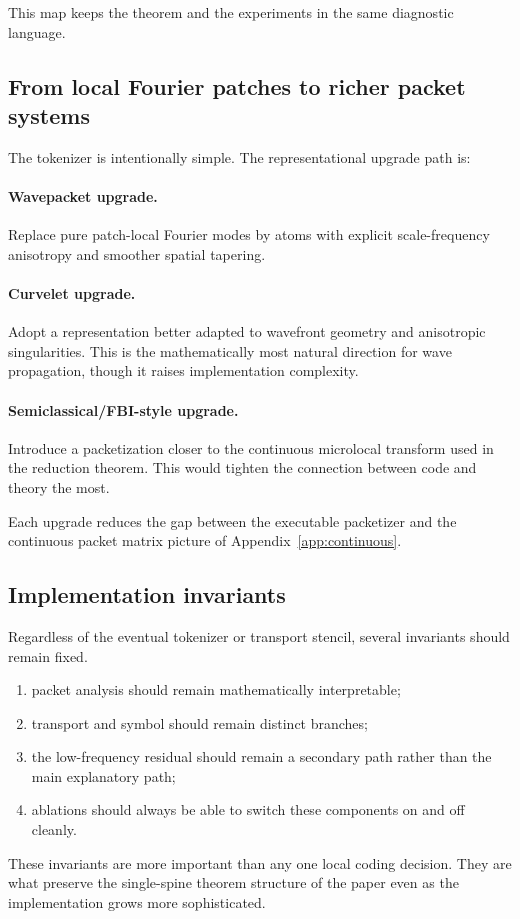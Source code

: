 This map keeps the theorem and the experiments in the same diagnostic language.

\subsection{From local Fourier patches to richer packet systems}

The tokenizer is intentionally simple. The representational upgrade path is:

\paragraph{Wavepacket upgrade.}
Replace pure patch-local Fourier modes by atoms with explicit scale-frequency anisotropy and smoother spatial tapering.

\paragraph{Curvelet upgrade.}
Adopt a representation better adapted to wavefront geometry and anisotropic singularities. This is the mathematically most natural direction for wave propagation, though it raises implementation complexity.

\paragraph{Semiclassical/FBI-style upgrade.}
Introduce a packetization closer to the continuous microlocal transform used in the reduction theorem. This would tighten the connection between code and theory the most.

Each upgrade reduces the gap between the executable packetizer and the continuous packet matrix picture of Appendix~\ref{app:continuous}.

\subsection{Implementation invariants}

Regardless of the eventual tokenizer or transport stencil, several invariants should remain fixed.
\begin{enumerate}
\item packet analysis should remain mathematically interpretable;
\item transport and symbol should remain distinct branches;
\item the low-frequency residual should remain a secondary path rather than the main explanatory path;
\item ablations should always be able to switch these components on and off cleanly.
\end{enumerate}
These invariants are more important than any one local coding decision. They are what preserve the single-spine theorem structure of the paper even as the implementation grows more sophisticated.
